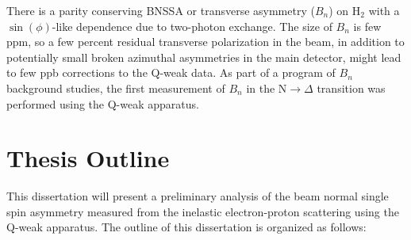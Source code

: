 There is a parity conserving BNSSA or transverse asymmetry ($B_{n}$) on H$_{2}$ with a $\sin(\phi)$-like dependence due to two-photon exchange. The size of $B_{n}$ is few ppm, so a few percent residual transverse polarization in the beam, in addition to potentially small broken azimuthal asymmetries in the main detector, might lead to few ppb corrections to the Q-weak data. As part of a program of $B_{n}$ background studies, the first measurement of $B_{n}$ in the N$\rightarrow\Delta$ transition was performed using the Q-weak apparatus. 


\section{Thesis Outline}%
\label{Thesis Outline}


This dissertation will present a preliminary analysis of the beam normal single spin asymmetry measured from the inelastic electron-proton scattering using the Q-weak apparatus. The outline of this dissertation is organized as follows:

